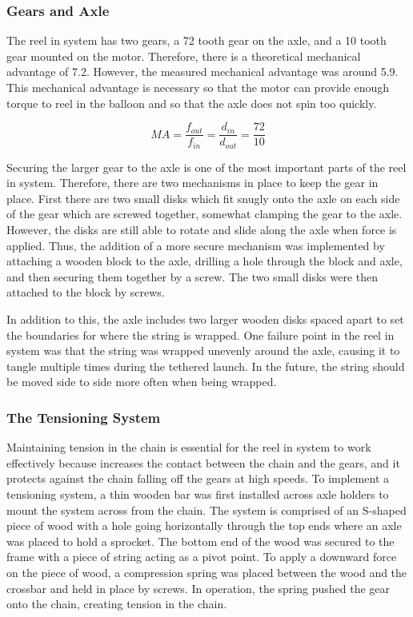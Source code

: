 \documentclass[12pt,]{article}
\begin{document}
\subsubsection{Gears and Axle}\label{gears-and-axle}

The reel in system has two gears, a 72 tooth gear on the axle, and a 10
tooth gear mounted on the motor. Therefore, there is a theoretical
mechanical advantage of 7.2. However, the measured mechanical advantage
was around 5.9. This mechanical advantage is necessary so that the motor
can provide enough torque to reel in the balloon and so that the axle
does not spin too quickly.

\[MA = \frac{f_{out}}{f_{in}} = \frac{d_{in}}{d_{out}} = \frac{72}{10}\]

Securing the larger gear to the axle is one of the most important parts
of the reel in system. Therefore, there are two mechanisms in place to
keep the gear in place. First there are two small disks which fit snugly
onto the axle on each side of the gear which are screwed together,
somewhat clamping the gear to the axle. However, the disks are still
able to rotate and slide along the axle when force is applied. Thus, the
addition of a more secure mechanism was implemented by attaching a
wooden block to the axle, drilling a hole through the block and axle,
and then securing them together by a screw. The two small disks were
then attached to the block by screws.

In addition to this, the axle includes two larger wooden disks spaced
apart to set the boundaries for where the string is wrapped. One failure
point in the reel in system was that the string was wrapped unevenly
around the axle, causing it to tangle multiple times during the tethered
launch. In the future, the string should be moved side to side more
often when being wrapped.

\subsubsection{The Tensioning System}\label{the-tensioning-system}

Maintaining tension in the chain is essential for the reel in system to
work effectively because increases the contact between the chain and the
gears, and it protects against the chain falling off the gears at high
speeds. To implement a tensioning system, a thin wooden bar was first
installed across axle holders to mount the system across from the chain.
The system is comprised of an S-shaped piece of wood with a hole going
horizontally through the top ends where an axle was placed to hold a
sprocket. The bottom end of the wood was secured to the frame with a
piece of string acting as a pivot point. To apply a downward force on
the piece of wood, a compression spring was placed between the wood and
the crossbar and held in place by screws. In operation, the spring
pushed the gear onto the chain, creating tension in the chain.
\end{document}
